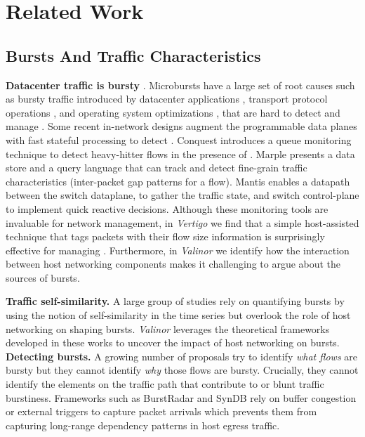 \chapter{Related Work}
\label{chap:related-work}

\section{Bursts And Traffic Characteristics}

\textbf{Datacenter traffic is bursty} \cite{bullet, wild, social, high-resolution,incast,milisampler}.
Microbursts have a large set of root causes such as bursty traffic introduced by datacenter applications \cite{measuring, gfs, panfs}, transport protocol operations \cite{ipbursts, why}, and operating system optimizations \cite{snap, bullet}, that are hard to detect and manage \cite{burstradar}. 
Some recent in-network designs augment the programmable data planes with fast stateful processing to detect \bursts. Conquest \cite{conquest} introduces a queue monitoring technique to detect heavy-hitter flows in the presence of \bursts. Marple \cite{marple} presents a data store and a query language that can track and detect fine-grain traffic characteristics (\eg inter-packet gap patterns for a flow). Mantis \cite{mantis} enables a datapath between the switch dataplane, to gather the traffic state, and switch control-plane to implement quick reactive decisions. 
Although these monitoring tools are invaluable for network management, in \textit{Vertigo} we find that a simple host-assisted technique that tags packets with their flow size information is surprisingly effective for managing \bursts. Furthermore, in \textit{Valinor} we identify how the interaction between host networking components makes it challenging to argue about the sources of bursts.

\textbf{Traffic self-similarity.}
A large group of studies rely on quantifying bursts by using the notion of self-similarity in the time series \cite{selfsim,filesize,norros1994storage,adas1995resource,park1997effect,self_similar_overview,vbr} but overlook the role of host networking on shaping bursts. \textit{Valinor} leverages the theoretical frameworks developed in these works to uncover the impact of host networking on bursts.
\\
\textbf{Detecting bursts.}
A growing number of proposals try to identify \emph{what flows} are bursty \cite{conquest,trumpet,flowradar,snappy} but they cannot identify \emph{why} those flows are bursty. Crucially, they cannot identify the elements on the traffic path that contribute to or blunt traffic burstiness. Frameworks such as BurstRadar \cite{radar} and SynDB \cite{syndb} rely on buffer congestion or external triggers to capture packet arrivals which prevents them from capturing long-range dependency patterns in host egress traffic.

